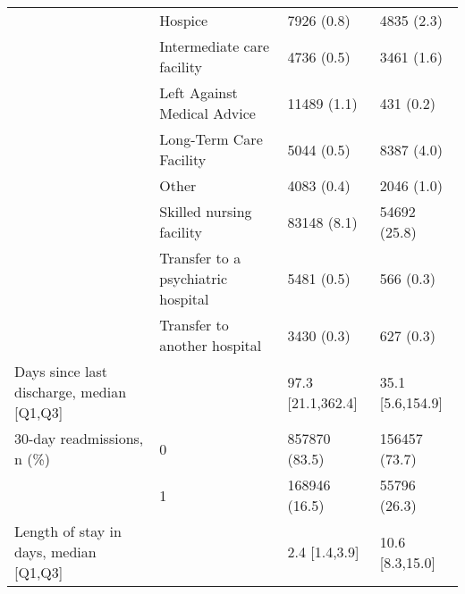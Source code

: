 \begin{tabular}{llll}
                                       & Hospice &                            7926 (0.8) &        4835 (2.3) \\
                                       & Intermediate care facility &                            4736 (0.5) &        3461 (1.6) \\
                                       & Left Against Medical Advice &                           11489 (1.1) &         431 (0.2) \\
                                       & Long-Term Care Facility &                            5044 (0.5) &        8387 (4.0) \\
                                       & Other &                            4083 (0.4) &        2046 (1.0) \\
                                       & Skilled nursing facility &                           83148 (8.1) &      54692 (25.8) \\
                                       & Transfer to a psychiatric hospital &                            5481 (0.5) &         566 (0.3) \\
                                       & Transfer to another hospital &                            3430 (0.3) &         627 (0.3) \\
Days since last discharge, median [Q1,Q3] &   &                     97.3 [21.1,362.4] &  35.1 [5.6,154.9] \\
30-day readmissions, n (\%) & 0 &                         857870 (83.5) &     156457 (73.7) \\
                                       & 1 &                         168946 (16.5) &      55796 (26.3) \\
Length of stay in days, median [Q1,Q3] &   &                         2.4 [1.4,3.9] &   10.6 [8.3,15.0] \\
\bottomrule
\end{tabular}
